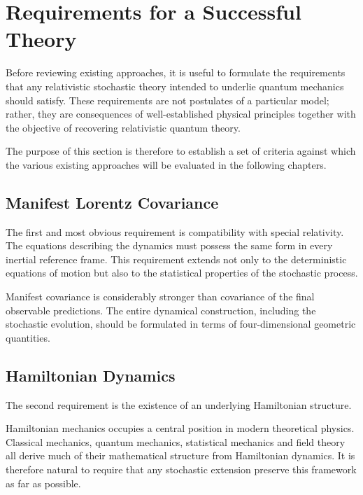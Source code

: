 \section{Requirements for a Successful Theory}

Before reviewing existing approaches, it is useful to formulate the
requirements that any relativistic stochastic theory intended to
underlie quantum mechanics should satisfy. These requirements are not
postulates of a particular model; rather, they are consequences of
well-established physical principles together with the objective of
recovering relativistic quantum theory.

The purpose of this section is therefore to establish a set of criteria
against which the various existing approaches will be evaluated in the
following chapters.

\subsection{Manifest Lorentz Covariance}

The first and most obvious requirement is compatibility with special
relativity. The equations describing the dynamics must possess the same
form in every inertial reference frame. This requirement extends not
only to the deterministic equations of motion but also to the
statistical properties of the stochastic process.

Manifest covariance is considerably stronger than covariance of the
final observable predictions. The entire dynamical construction,
including the stochastic evolution, should be formulated in terms of
four-dimensional geometric quantities.

\subsection{Hamiltonian Dynamics}

The second requirement is the existence of an underlying Hamiltonian
structure.

Hamiltonian mechanics occupies a central position in modern theoretical
physics. Classical mechanics, quantum mechanics, statistical mechanics
and field theory all derive much of their mathematical structure from
Hamiltonian dynamics. It is therefore natural to require that any
stochastic extension preserve this framework as far as possible.

